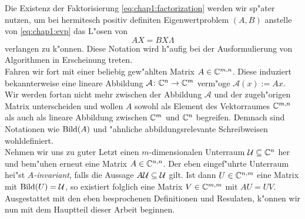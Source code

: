 Die Existenz der Faktorisierung \eqref{eq:chap1:factorization}
werden wir sp"ater nutzen, um bei hermitesch positiv definiten Eigenwertproblem $(A,B)$ anstelle von \eqref{eq:chap1:evp} das L"osen von
\[
AX = BX\Lambda
\]
verlangen zu k"onnen. Diese Notation wird h"aufig bei der Ausformulierung von Algorithmen in Erscheinung treten.\\

Fahren wir fort mit einer beliebig gew"ahlten Matrix $A\in\mathbb{C}^{m,n}$. Diese induziert bekannterweise eine lineare Abbildung $\mathcal{A}\colon\mathbb{C}^n\to\mathbb{C}^{m}$ verm"oge $\mathcal{A}(x) := Ax$.
Wir werden fortan nicht mehr zwischen der Abbildung $\mathcal{A}$ und der zugeh"origen Matrix unterscheiden und wollen $A$ sowohl als Element des Vektorraumes $\mathbb{C}^{m,n}$
als auch als lineare Abbildung zwischen $\mathbb{C}^m$ und $\mathbb{C}^n$ begreifen. Demnach sind Notationen wie $\operatorname{Bild}(A)$ und "ahnliche abbildungsrelevante Schreibweisen wohldefiniert.\\

Nehmen wir uns zu guter Letzt einen $m$-dimensionalen Unterraum $\mathcal{U} \subseteq \mathbb{C}^n$ her und bem"uhen erneut eine Matrix $A\in\mathbb{C}^{n,n}$.
Der eben eingef"uhrte Unterraum hei"st \emph{$A$-invariant}, falls die Aussage $A\mathcal{U}\subseteq\mathcal{U}$ gilt.
Ist dann $U\in\mathbb{C}^{n,m}$ eine Matrix mit $\operatorname{Bild}(U)=\mathcal{U}$, so existiert folglich eine Matrix $V\in\mathbb{C}^{m,m}$ mit $AU = UV$.\\

Ausgestattet mit den eben besprochenen Definitionen und Resulaten, k"onnen wir nun mit dem Hauptteil dieser Arbeit beginnen.









